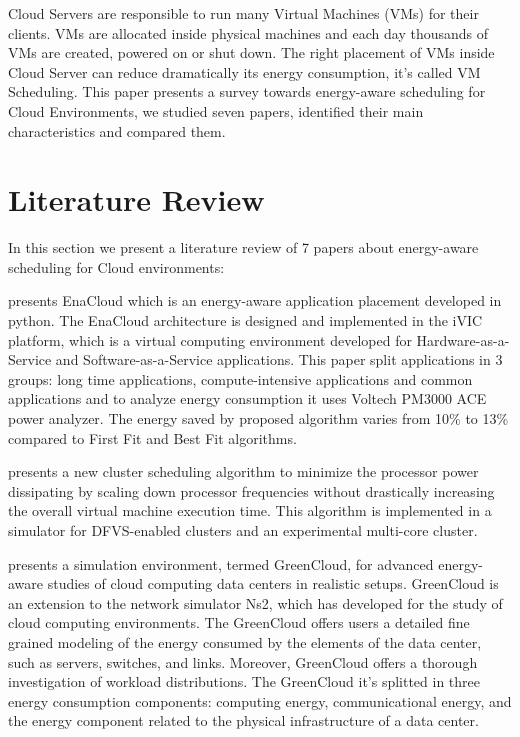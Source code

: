 \documentclass{article}
\begin{document}
Cloud Servers are responsible to run many Virtual Machines (VMs) for their clients. VMs are allocated inside physical machines and each day thousands of VMs are created, powered on or shut down. The right placement of VMs inside Cloud Server can reduce dramatically its energy consumption, it's called VM Scheduling. This paper presents a survey towards energy-aware scheduling for Cloud Environments, we studied seven papers, identified their main characteristics and compared them.  

\section{Literature Review}

In this section we present a literature review of 7 papers about energy-aware scheduling for Cloud environments:

\cite{bli:2009} presents EnaCloud which is an energy-aware application placement developed in python. The EnaCloud architecture is designed and implemented in the iVIC platform, which is a virtual computing environment developed for Hardware-as-a-Service and Software-as-a-Service applications. This paper split applications in 3 groups: long time applications, compute-intensive applications and common applications and to analyze energy consumption it uses Voltech PM3000 ACE power analyzer. The energy saved by proposed algorithm varies from 10\% to 13\% compared to First Fit and Best Fit algorithms.

\cite{Gregor} presents a new cluster scheduling algorithm to minimize the processor power dissipating by scaling down processor frequencies without drastically increasing the overall virtual machine execution time. This algorithm is implemented in a simulator for DFVS-enabled clusters and an experimental
multi-core cluster. 

\cite{Dzmitry} presents a simulation environment, termed
GreenCloud, for advanced energy-aware studies of cloud
computing data centers in realistic setups. GreenCloud is an extension to the network simulator Ns2, which has developed for the study of cloud computing environments. The GreenCloud offers users a detailed fine grained modeling of the energy consumed by the elements of the data center, such as servers, switches, and links. Moreover, GreenCloud offers a thorough investigation of workload distributions. The GreenCloud it's splitted in three energy consumption components: computing energy, communicational energy, and the energy component related to the physical infrastructure of a data center. 
\end{document}
